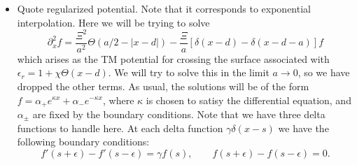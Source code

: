 \begin{itemize}
  \item {Quote regularized potential.  Note that it corresponds to exponential interpolation.}
    Here we will be trying to solve
    \begin{equation}
      \partial_x^2f =\frac{\Xi^2}{a^2}\Theta(a/2-|x-d|) - \frac{\Xi}{a}[\delta(x-d)-\delta(x-d-a)]f
    \end{equation}
    which arises as the TM potential for crossing the surface associated with $\epsilon_r = 1+\chi\Theta(x-d)$.  We will try to solve this in the limit $a\rightarrow 0$, so we have dropped the other terms.  
    As usual, the solutions will be of the form $f = \alpha_+ e^{\kappa x}+\alpha_- e^{-\kappa x}$, where $\kappa$ is chosen to satisy the differential equation, and $\alpha_\pm$ are fixed by the boundary conditions.  Note that we have three delta functions to handle here.  At each delta function $\gamma \delta(x-s)$ we have the following boundary conditions:
    \begin{equation}
      f'(s+\epsilon)-f'(s-\epsilon) = \gamma f(s),\qquad f(s+\epsilon)-f(s-\epsilon) = 0.
    \end{equation}


\end{itemize}

